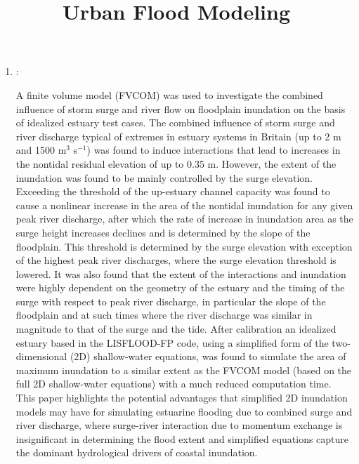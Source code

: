 \documentclass[a4paper, 12pt]{article}
\title{Urban Flood Modeling}
\begin{document}
\maketitle
    
\begin{enumerate}
\item \textcolor{Maroon}{\textbf{\cite{Maskell_2014}}:}

A finite volume model (FVCOM) was used to investigate the combined influence of storm surge and river flow on floodplain inundation on the basis of idealized estuary test cases. The combined influence of storm surge and river discharge typical of extremes in estuary systems in Britain (up to 2 m and 1500 m$^3$ s$^{-1}$) was found to induce interactions that lead to increases in the nontidal residual elevation of up to 0.35 m. However, the extent of the inundation was found to be mainly controlled by the surge elevation. Exceeding the threshold of the up-estuary channel capacity was found to cause a nonlinear increase in the area of the nontidal inundation for any given peak river discharge, after which the rate of increase in inundation area as the surge height increases declines and is determined by the slope of the floodplain. This threshold is determined by the surge elevation with exception of the highest peak river discharges, where the surge elevation threshold is lowered. It was also found that the extent of the interactions and inundation were highly dependent on the geometry of the estuary and the timing of the surge with respect to peak river discharge, in particular the slope of the floodplain and at such times where the river discharge was similar in magnitude to that of the surge and the tide. After calibration an idealized estuary based in the LISFLOOD-FP code, using a simplified form of the two-dimensional (2D) shallow-water equations, was found to simulate the area of maximum inundation to a similar extent as the FVCOM model (based on the full 2D shallow-water equations) with a much reduced computation time. This paper highlights the potential advantages that simplified 2D inundation models may have for simulating estuarine flooding due to combined surge and river discharge, where surge-river interaction due to momentum exchange is insignificant in determining the flood extent and simplified equations capture the dominant hydrological drivers of coastal inundation.

\end{enumerate}
\end{document}
